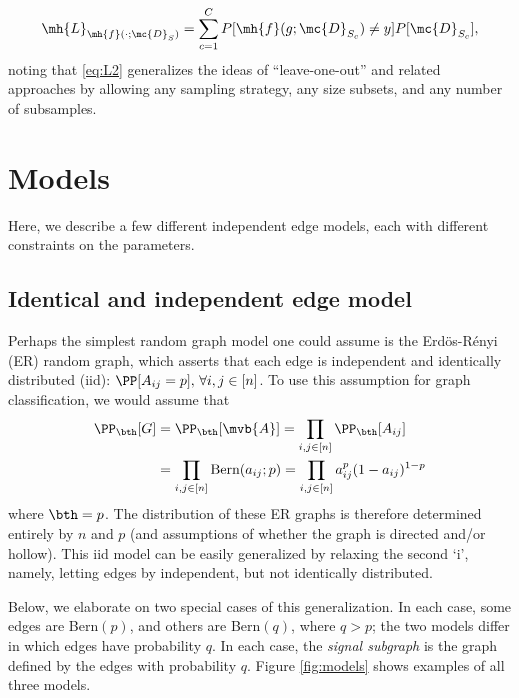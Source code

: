 \begin{align} \label{eq:L2}
	\mh{L}_{\mh{f}(\cdot; \mc{D}_S)} = \sum_{c=1}^C P[\mh{f}(g; \mc{D}_{S_c}) \neq y]  P[\mc{D}_{S_c}],
\end{align}
noting that \eqref{eq:L2} generalizes the ideas of ``leave-one-out'' and related approaches by allowing any sampling strategy, any size subsets, and any number of subsamples.  %


\section{Models} %
\label{sub:models}

Here, we describe a few different independent edge models, each with different constraints on the parameters.


\subsection{Identical and independent edge model} %
\label{sub:ER}


Perhaps the simplest random graph model one could assume is the Erd\"os-R\'enyi (ER) random graph, which asserts that each edge is independent and identically distributed (iid): $\PP[A_{ij}=p], \, \forall i,j \in [n]$.  To use this assumption for graph classification, we would assume that 
\begin{align}
	\PP_{\bth}[G]&=\PP_{\bth}[\mvb{A}]=\prod_{i,j \in [n]} \PP_{\bth}[A_{ij}] %
	\nonumber \\&= \prod_{i,j \in [n]} \text{Bern}(a_{ij}; p) = \prod_{i,j \in [n]} a_{ij}^{p}(1-a_{ij})^{1-p}
\end{align}
where $\bth=p$.  The distribution of these ER graphs is therefore determined entirely by $n$ and $p$ (and assumptions of whether the graph is directed and/or hollow).  This iid model can be easily generalized by relaxing the second `i', namely, letting edges by independent, but not identically distributed.  

Below, we elaborate on two special cases of this generalization.  In each case, some edges are Bern$(p)$, and others are Bern$(q)$, where $q>p$; the two models differ in which edges have probability $q$. In each case, the \emph{signal subgraph} is the graph defined by the edges with probability $q$.  Figure \ref{fig:models} shows examples of all three models.



